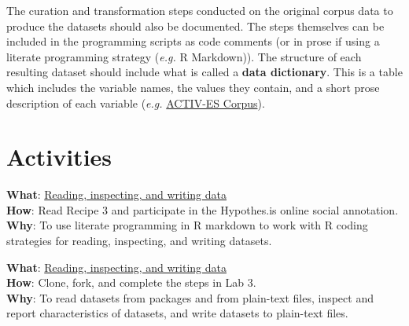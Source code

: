 \documentclass[
  letterpaper,
]{latex/krantz}
\begin{document}
The curation and transformation steps conducted on the original corpus
data to produce the datasets should also be documented. The steps
themselves can be included in the programming scripts as code comments
(or in prose if using a literate programming strategy (\emph{e.g.} R
Markdown)). The structure of each resulting dataset should include what
is called a \textbf{data dictionary}. This is a table which includes the
variable names, the values they contain, and a short prose description
of each variable (\emph{e.g.} \href{https://osf.io/9jafz/}{ACTIV-ES
Corpus}).

\hypertarget{activities-1}{%
\section*{Activities}\label{activities-1}}

\begin{tcolorbox}[enhanced jigsaw, opacitybacktitle=0.6, breakable, colframe=quarto-callout-tip-color-frame, arc=.35mm, left=2mm, leftrule=.75mm, title=\textcolor{quarto-callout-tip-color}{\faLightbulb}\hspace{0.5em}{Recipe}, opacityback=0, colback=white, toptitle=1mm, rightrule=.15mm, titlerule=0mm, bottomtitle=1mm, bottomrule=.15mm, coltitle=black, colbacktitle=quarto-callout-tip-color!10!white, toprule=.15mm]
\textbf{What}:
\href{https://lin380.github.io/tadr/articles/recipe_3.html}{Reading,
inspecting, and writing data}\\
\textbf{How}: Read Recipe 3 and participate in the Hypothes.is online
social annotation.\\
\textbf{Why}: To use literate programming in R markdown to work with R
coding strategies for reading, inspecting, and writing datasets.
\end{tcolorbox}

\begin{tcolorbox}[enhanced jigsaw, opacitybacktitle=0.6, breakable, colframe=quarto-callout-tip-color-frame, arc=.35mm, left=2mm, leftrule=.75mm, title=\textcolor{quarto-callout-tip-color}{\faLightbulb}\hspace{0.5em}{Lab}, opacityback=0, colback=white, toptitle=1mm, rightrule=.15mm, titlerule=0mm, bottomtitle=1mm, bottomrule=.15mm, coltitle=black, colbacktitle=quarto-callout-tip-color!10!white, toprule=.15mm]
\textbf{What}: \href{https://github.com/lin380/lab_3}{Reading,
inspecting, and writing data}\\
\textbf{How}: Clone, fork, and complete the steps in Lab 3.\\
\textbf{Why}: To read datasets from packages and from plain-text files,
inspect and report characteristics of datasets, and write datasets to
plain-text files.
\end{tcolorbox}
\end{document}
